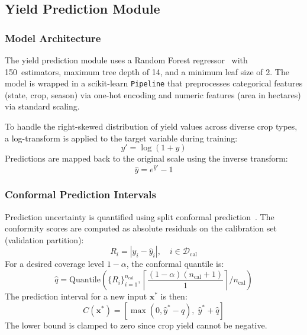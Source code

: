 \documentclass[conference]{IEEEtran}
\begin{document}
\subsection{Yield Prediction Module}
\label{subsec:yield_method}

\subsubsection{Model Architecture}
The yield prediction module uses a Random Forest regressor~\cite{breiman2001random} with 150~estimators, maximum tree depth of 14, and a minimum leaf size of 2. The model is wrapped in a scikit-learn \texttt{Pipeline} that preprocesses categorical features (state, crop, season) via one-hot encoding and numeric features (area in hectares) via standard scaling.

To handle the right-skewed distribution of yield values across diverse crop types, a log-transform is applied to the target variable during training:
\begin{equation}
  y' = \log(1 + y)
\end{equation}
Predictions are mapped back to the original scale using the inverse transform:
\begin{equation}
  \hat{y} = e^{\hat{y}'} - 1
\end{equation}

\subsubsection{Conformal Prediction Intervals}
Prediction uncertainty is quantified using split conformal prediction~\cite{vovk2005algorithmic,papadopoulos2002inductive}. The conformity scores are computed as absolute residuals on the calibration set (validation partition):
\begin{equation}
  R_{i} = |y_{i} - \hat{y}_{i}|, \quad i \in \mathcal{D}_{\text{cal}}
\end{equation}
For a desired coverage level $1 - \alpha$, the conformal quantile is:
\begin{equation}
  \hat{q} = \text{Quantile}\!\left(\{R_{i}\}_{i=1}^{n_{\text{cal}}}, \left\lceil \frac{(1-\alpha)(n_{\text{cal}} + 1)}{1} \right\rceil\Big/n_{\text{cal}}\right)
\end{equation}
The prediction interval for a new input $\mathbf{x}^{*}$ is then:
\begin{equation}
  C(\mathbf{x}^{*}) = \left[\max(0, \hat{y}^{*} - \hat{q}),\; \hat{y}^{*} + \hat{q}\right]
\end{equation}
The lower bound is clamped to zero since crop yield cannot be negative.
\end{document}
